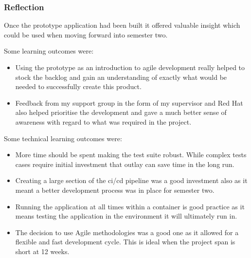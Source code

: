 \subsubsection{Reflection}
Once the prototype application had been built it offered valuable insight which could be used when moving forward into semester two.

Some learning outcomes were:
\begin{itemize}
	\item Using the prototype as an introduction to agile development really helped to stock the \gls{backlog} and gain an understanding of exactly what would be needed to successfully create this product.
	\item Feedback from my support group in the form of my supervisor and Red Hat also helped prioritise the development and gave a much better sense of awareness with regard to what was required in the project.
\end{itemize}

Some technical learning outcomes were:
\begin{itemize}
	\item More time should be spent making the test suite robust. While complex tests cases require initial investment that outlay can save time in the long run.
	\item Creating a large section of the \gls{ci/cd} pipeline was a good investment also as it meant a better development process was in place for semester two.
	\item Running the application at all times within a container is good practice as it means testing the application in the environment it will ultimately run in.
	\item The decision to use Agile methodologies was a good one as it allowed for a flexible and fast development cycle. This is ideal when the project span is short at 12 weeks.
\end{itemize}
